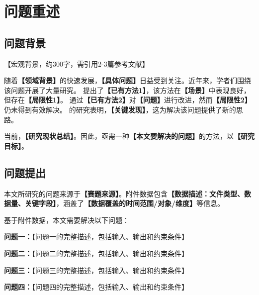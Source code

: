 
\section{问题重述}

\subsection{问题背景}

【宏观背景，约300字，需引用2-3篇参考文献】

随着\textbf{【领域背景】}的快速发展，\textbf{【具体问题】}日益受到关注。近年来，学者们围绕该问题开展了大量研究。\cite{ref1} 提出了\textbf{【已有方法1】}，该方法在\textbf{【场景】}中表现良好，但存在\textbf{【局限性1】}。\cite{ref2} 通过\textbf{【已有方法2】}对\textbf{【问题】}进行改进，然而\textbf{【局限性2】}仍未得到有效解决。\cite{ref3} 的研究表明，\textbf{【关键发现】}，这为解决该问题提供了新的思路。

当前，\textbf{【研究现状总结】}。因此，亟需一种\textbf{【本文要解决的问题】}的方法，以\textbf{【研究目标】}。

\subsection{问题提出}

本文所研究的问题来源于\textbf{【赛题来源】}。附件数据包含\textbf{【数据描述：文件类型、数据量、关键字段】}，涵盖了\textbf{【数据覆盖的时间范围/对象/维度】}等信息。

基于附件数据，本文需要解决以下问题：

\textbf{问题一：}【问题一的完整描述，包括输入、输出和约束条件】

\textbf{问题二：}【问题二的完整描述，包括输入、输出和约束条件】

\textbf{问题三：}【问题三的完整描述，包括输入、输出和约束条件】

\textbf{问题四：}【问题四的完整描述，包括输入、输出和约束条件】
